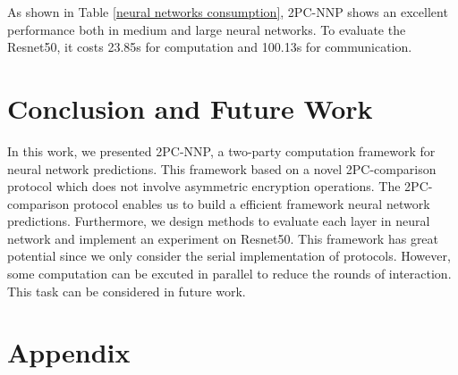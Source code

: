 \documentclass[letterpaper]{article} %
\begin{document}
    \begin{table}[!ht]

        \center
        \caption{Experiment III-Neural networks consumption}
        \label{neural networks consumption}
    \end{table}

    As shown in Table \ref{neural networks consumption}, 2PC-NNP shows an excellent performance
    both in medium and large neural networks. To evaluate the Resnet50,
    it costs 23.85s for computation and 100.13s for communication.

    \section{Conclusion and Future Work}
    In this work, we presented 2PC-NNP, a two-party computation framework for neural network predictions.
    This framework based on a novel 2PC-comparison protocol which does not involve asymmetric encryption operations.
    The 2PC-comparison protocol enables us to build a efficient framework neural network predictions.
    Furthermore, we design methods to evaluate each layer in neural network and implement an experiment on Resnet50.
    This framework has great potential since we only consider the serial implementation of protocols.
    However, some computation can be excuted in parallel to reduce the rounds of interaction.
    This task can be considered in future work.




    \section{Appendix}
\end{document}
